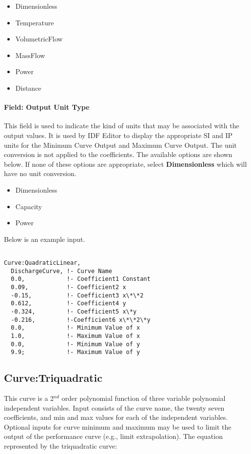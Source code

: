 \begin{itemize}
\item
  Dimensionless
\item
  Temperature
\item
  VolumetricFlow
\item
  MassFlow
\item
  Power
\item
  Distance
\end{itemize}

\paragraph{Field: Output Unit Type}\label{field-output-unit-type-9}

This field is used to indicate the kind of units that may be associated with the output values. It is used by IDF Editor to display the appropriate SI and IP units for the Minimum Curve Output and Maximum Curve Output. The unit conversion is not applied to the coefficients. The available options are shown below. If none of these options are appropriate, select \textbf{Dimensionless} which will have no unit conversion.

\begin{itemize}
\item
  Dimensionless
\item
  Capacity
\item
  Power
\end{itemize}

Below is an example input.

\begin{lstlisting}

Curve:QuadraticLinear,
  DischargeCurve, !- Curve Name
  0.0,            !- Coefficient1 Constant
  0.09,           !- Coefficient2 x
  -0.15,          !- Coefficient3 x\*\*2
  0.612,          !- Coefficient4 y
  -0.324,         !- Coefficient5 x\*y
  -0.216,         !-Coefficient6 x\*\*2\*y
  0.0,            !- Minimum Value of x
  1.0,            !- Maximum Value of x
  0.0,            !- Minimum Value of y
  9.9;            !- Maximum Value of y
\end{lstlisting}

\subsection{Curve:Triquadratic}\label{curvetriquadratic}

This curve is a 2\(^{nd}\) order polynomial function of three variable polynomial independent variables. Input consists of the curve name, the twenty seven coefficients, and min and max values for each of the independent variables. Optional inputs for curve minimum and maximum may be used to limit the output of the performance curve (e.g., limit extrapolation). The equation represented by the triquadratic curve:

